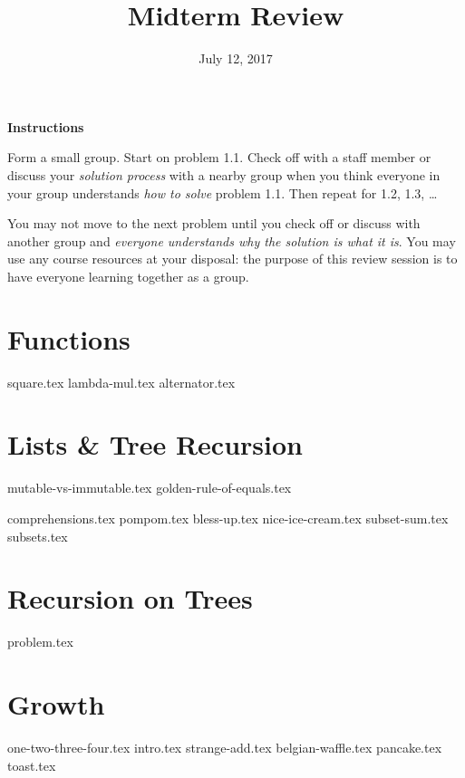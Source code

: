 \documentclass{exam}
\title{Midterm Review}
\date{July 12, 2017}
\begin{document}
\maketitle

\textbf{Instructions}

Form a small group. Start on problem 1.1. Check off with a staff member or
discuss your \emph{solution process} with a nearby group when you think everyone
in your group understands \emph{how to solve} problem 1.1. Then repeat for 1.2,
1.3, \ldots

You may not move to the next problem until you check off or discuss with another
group and \emph{everyone understands why the solution is what it is}. You may
use any course resources at your disposal: the purpose of this review session is
to have everyone learning together as a group.

\section{Functions}
\begin{questions}
{square.tex}
{lambda-mul.tex}
{alternator.tex}
\end{questions}

\section{Lists \& Tree Recursion}
{mutable-vs-immutable.tex}
{golden-rule-of-equals.tex}
\begin{questions}
{comprehensions.tex}
{pompom.tex}
{bless-up.tex}
{nice-ice-cream.tex}
{subset-sum.tex}
{subsets.tex}
\end{questions}

\section{Recursion on Trees}
\begin{questions}
{problem.tex}
\end{questions}

\section{Growth}
\begin{questions}
{one-two-three-four.tex}
{intro.tex}
{strange-add.tex}
{belgian-waffle.tex}
{pancake.tex}
{toast.tex}
\end{questions}
\end{document}
